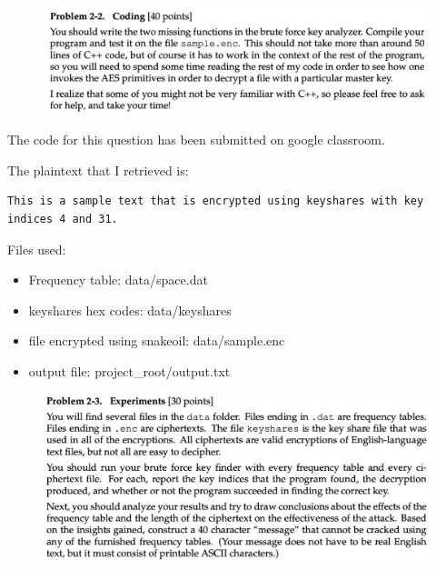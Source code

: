 \documentclass{ashoka-crypto}
\begin{document}
\clearpage

\begin{figure}[h]
\includegraphics[width=17cm]{2}
\centering
\end{figure}

The code for this question has been submitted on google classroom.

The plaintext that I retrieved is:
\begin{verbatim}
This is a sample text that is encrypted using keyshares with key
indices 4 and 31.
\end{verbatim}

Files used:
\begin{itemize}
\item Frequency table: data/space.dat
\item keyshares hex codes: data/keyshares
\item file encrypted using snakeoil: data/sample.enc
\item output file: project\_root/output.txt
\end{itemize}

\clearpage

\begin{figure}[h]
\includegraphics[width=17cm]{3}
\centering
\end{figure}
\end{document}
